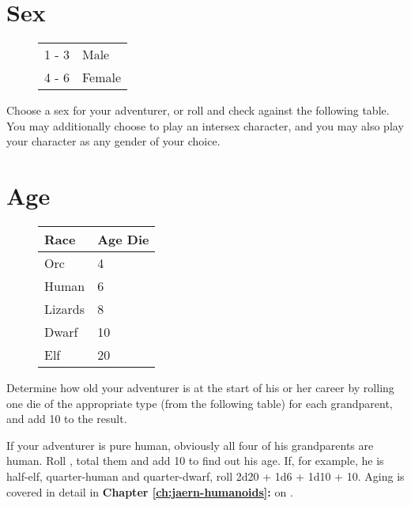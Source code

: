 \begin{multicols*}{2}
\section{Sex}
\vspace{-10pt}
\begin{wrapfigure}[6]{o}[0pt]{2.75cm}
\begin{normbox}
\begin{tabular}{l l}
1 - 3 & Male\\
4 - 6 & Female
\end{tabular}
\end{normbox}
\end{wrapfigure}
Choose a sex for your adventurer, or roll  and check against the following table. You may additionally choose to play an intersex character, and you may also play your character as any gender of your choice.
\section{Age}
\vspace{-10pt}
\begin{wrapfigure}[10]{o}[0pt]{3.25cm}
\begin{normbox}
\begin{tabular}{l l}
\textbf{Race} & \textbf{Age Die}\\
\midrule
Orc & 4\\
Human & 6\\
Lizards &  8\\
Dwarf & 10\\
Elf &  20\\
\end{tabular}
\end{normbox}
\end{wrapfigure}
Determine how old your adventurer is at the start of his or her career by rolling one die of the appropriate type
(from the following table) for each grandparent, and add 10 to the result.

If your adventurer is pure human, obviously all four of his grandparents are human. Roll , total them and add 10 to find out his age. If, for example, he is half-elf, quarter-human and quarter-dwarf, roll 2d20 + 1d6 + 1d10 + 10. Aging is covered in detail in \textbf{Chapter \ref{ch:jaern-humanoids}: } on \tcpage{\pageref{ch:jaern-humanoids}}.
\end{multicols*}
